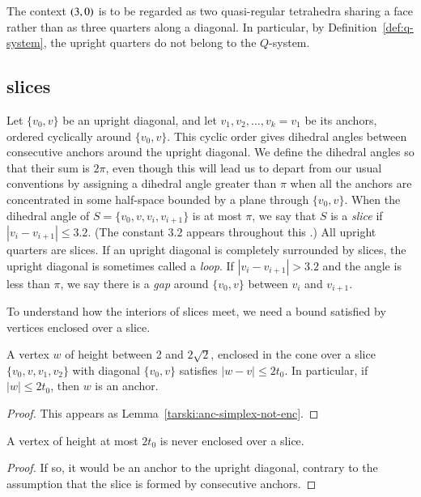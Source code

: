 The context $\relax(3,0)$ is to be regarded as two
quasi-regular tetrahedra sharing a face rather than as three
quarters along a diagonal.  In particular, by
Definition~\ref{def:q-system}, the upright quarters do not belong
to the $Q$-system.

\subsection{slices} %
    \label{sec:slice}  %

Let $\{v_0,v\}$ be an upright diagonal, and let
$v_1,v_2,\ldots,v_k=v_1$ be its anchors, ordered cyclically around
$\{v_0,v\}$.  This cyclic order gives dihedral angles between
consecutive anchors around the upright diagonal. We define the
dihedral angles so that their sum is $2\pi$, even though this will
lead us to depart from our usual conventions by assigning a
dihedral angle greater than $\pi$ when all the anchors are
concentrated in some half-space bounded by a plane through
$\{v_0,v\}$. When the dihedral angle of $S=\{v_0,v,v_i,v_{i+1}\}$ is at
most $\pi$, we say that $S$ is a {\it slice\/} if
$|v_i-v_{i+1}|\le3.2$. (The constant $3.2$ appears throughout this
\chap.) All upright quarters are slices. If an upright
diagonal is completely surrounded by slices, the
upright diagonal is sometimes called a {\it loop}. If
$|v_i-v_{i+1}|>3.2$ and the angle is less than $\pi$, we say there
is a {\it gap\/} around $\{v_0,v\}$ between $v_i$ and $v_{i+1}$.

To understand how the interiors of slices meet, we
need a bound satisfied by vertices enclosed over a slice.


\begin{lemma}
    \label{lemma:anc-simplex-not-enc}
A vertex $w$ of height between 2 and $2\sqrt{2}$, enclosed in the cone
over a slice $\{v_0,v,v_1,v_2\}$ with diagonal $\{v_0,v\}$ satisfies
$|w-v|\le 2t_0$. In particular, if $|w|\le 2t_0$, then $w$ is an anchor.
\end{lemma}

\begin{proof}
This appears as Lemma~\ref{tarski:anc-simplex-not-enc}.
\end{proof}


\begin{corollary}
A vertex of height at most $2t_0$ is never enclosed over a slice.
\end{corollary}

\begin{proof}  If so, it would be an anchor to the upright diagonal, contrary to
the assumption that the slice is formed by consecutive
anchors.
\end{proof}


